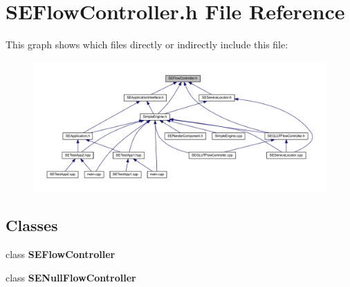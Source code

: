 \section{S\+E\+Flow\+Controller.\+h File Reference}
\label{_s_e_flow_controller_8h}
This graph shows which files directly or indirectly include this file\+:
\nopagebreak
\begin{figure}[H]
\begin{center}
\leavevmode
\includegraphics[width=350pt]{_s_e_flow_controller_8h__dep__incl}
\end{center}
\end{figure}
\subsection*{Classes}
\begin{DoxyCompactItemize}
\item 
class {\bf S\+E\+Flow\+Controller}
\item 
class {\bf S\+E\+Null\+Flow\+Controller}
\end{DoxyCompactItemize}
